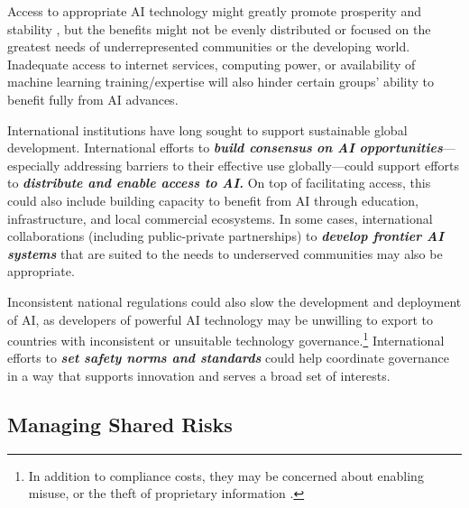 \documentclass[12pt]{article}
\begin{document}
Access to appropriate AI technology might greatly promote prosperity and
stability \cite{vinuesa_role_2020},
but the benefits might not be evenly distributed or focused on 
the greatest needs of underrepresented communities or
the developing world. Inadequate access to internet services, computing
power, or availability of machine learning training/expertise will also
hinder certain groups' ability to benefit fully from AI advances.

International institutions have long sought to support sustainable
global development. International efforts to \emph{\textbf{build
consensus} \textbf{on AI opportunities}}---especially addressing
barriers to their effective use globally---could support efforts to
\emph{\textbf{distribute and enable access to AI.}} On top of
facilitating access, this could also include building capacity to benefit from AI 
through
education, infrastructure, and local commercial ecosystems. In some
cases, international collaborations (including public-private
partnerships) to \emph{\textbf{develop frontier AI systems}} that are
suited to the needs to underserved communities may also be appropriate.

Inconsistent national regulations could also slow the development and
deployment of AI, as developers of powerful AI technology may be unwilling
to export to countries with inconsistent or unsuitable technology
governance.\footnote{In addition to compliance costs, 
they may be concerned about enabling
  misuse, or the theft of proprietary information \cite{awokuse_stronger_2010}.}
International efforts to \emph{\textbf{set safety norms and standards}}
could help coordinate governance in a way that supports innovation and
serves a broad set of interests.

\subsection*{Managing Shared Risks}
\end{document}
